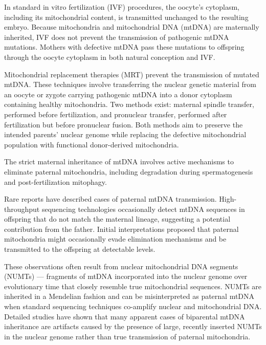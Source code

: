 In standard in vitro fertilization (IVF) procedures, the oocyte’s cytoplasm, including its mitochondrial content, is transmitted unchanged to the resulting embryo. Because mitochondria and mitochondrial DNA (mtDNA) are maternally inherited, IVF does not prevent the transmission of pathogenic mtDNA mutations. Mothers with defective mtDNA pass these mutations to offspring through the oocyte cytoplasm in both natural conception and IVF.

Mitochondrial replacement therapies (MRT) prevent the transmission of mutated mtDNA. These techniques involve transferring the nuclear genetic material from an oocyte or zygote carrying pathogenic mtDNA into a donor cytoplasm containing healthy mitochondria. Two methods exist: maternal spindle transfer, performed before fertilization, and pronuclear transfer, performed after fertilization but before pronuclear fusion. Both methods aim to preserve the intended parents' nuclear genome while replacing the defective mitochondrial population with functional donor-derived mitochondria.

The strict maternal inheritance of mtDNA involves active mechanisms to eliminate paternal mitochondria, including degradation during spermatogenesis and post-fertilization mitophagy.

Rare reports have described cases of paternal mtDNA transmission. High-throughput sequencing technologies occasionally detect mtDNA sequences in offspring that do not match the maternal lineage, suggesting a potential contribution from the father. Initial interpretations proposed that paternal mitochondria might occasionally evade elimination mechanisms and be transmitted to the offspring at detectable levels.

 These observations often result from nuclear mitochondrial DNA segments (NUMTs) — fragments of mtDNA incorporated into the nuclear genome over evolutionary time that closely resemble true mitochondrial sequences. NUMTs are inherited in a Mendelian fashion and can be misinterpreted as paternal mtDNA when standard sequencing techniques co-amplify nuclear and mitochondrial DNA. Detailed studies have shown that many apparent cases of biparental mtDNA inheritance are artifacts caused by the presence of large, recently inserted NUMTs in the nuclear genome rather than true transmission of paternal mitochondria.


